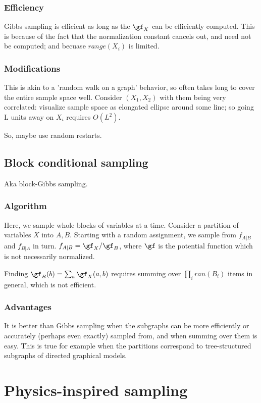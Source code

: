 \documentclass[oneside, article]{memoir}
\begin{document}
\subsubsection{Efficiency}
Gibbs sampling is efficient as long as the $\gf_X$ can be efficiently computed. This is because of the fact that the normalization constant cancels out, and need not be computed; and becuase $range(X_i)$ is limited.

\subsubsection{Modifications}
This is akin to a 'random walk on a graph' behavior, so often takes long to cover the entire sample space well. Consider $(X_1, X_2)$ with them being very correlated: visualize sample space as elongated ellipse around some line; so going L units away on $X_i$ requires $O(L^{2})$.

So, maybe use random restarts.

\subsection{Block conditional sampling}
Aka block-Gibbs sampling.

\subsubsection{Algorithm}
Here, we sample whole blocks of variables at a time. Consider a partition of variables $X$ into $A, B$. Starting with a random assignment, we sample from $f_{A|B}$ and $f_{B|A}$ in turn. $f_{A|B} = \gf_X/\gf_B$, where $\gf$ is the potential function which is not necessarily normalized.

Finding $\gf_B(b) = \sum_a \gf_X(a, b)$ requires summing over $\prod_i ran(B_i)$ items in general, which is not efficient.


\subsubsection{Advantages}


It is better than Gibbs sampling when the subgraphs can be more efficiently or accurately (perhaps even exactly) sampled from, and when summing over them is easy. This is true for example when the partitions correspond to tree-structured subgraphs of directed graphical models.

\section{Physics-inspired sampling}
\end{document}
